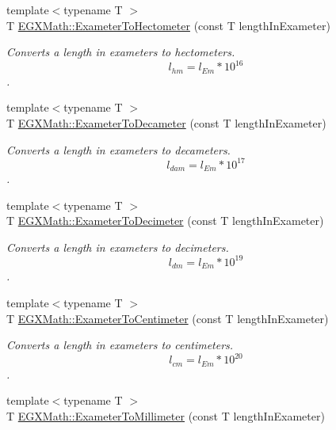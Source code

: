 \begin{DoxyCompactItemize}
{\footnotesize template$<$typename T $>$ }\\T \mbox{\hyperlink{group___e_g_x_math-_conversions-_length_conversions-_exameter-_s_i_gaa8f58d36da35b834499715694c75ce99}{E\+G\+X\+Math\+::\+Exameter\+To\+Hectometer}} (const T length\+In\+Exameter)
\begin{DoxyCompactList}\small\item\em Converts a length in exameters to hectometers. \[ l_{hm}=l_{Em} * 10^{16} \]. \end{DoxyCompactList}\item 
{\footnotesize template$<$typename T $>$ }\\T \mbox{\hyperlink{group___e_g_x_math-_conversions-_length_conversions-_exameter-_s_i_ga06159c597dfa489a8981c261622bf574}{E\+G\+X\+Math\+::\+Exameter\+To\+Decameter}} (const T length\+In\+Exameter)
\begin{DoxyCompactList}\small\item\em Converts a length in exameters to decameters. \[ l_{dam}=l_{Em} * 10^{17} \]. \end{DoxyCompactList}\item 
{\footnotesize template$<$typename T $>$ }\\T \mbox{\hyperlink{group___e_g_x_math-_conversions-_length_conversions-_exameter-_s_i_ga6d2909e8189cfc7b07d846a34f277afb}{E\+G\+X\+Math\+::\+Exameter\+To\+Decimeter}} (const T length\+In\+Exameter)
\begin{DoxyCompactList}\small\item\em Converts a length in exameters to decimeters. \[ l_{dm}=l_{Em} * 10^{19} \]. \end{DoxyCompactList}\item 
{\footnotesize template$<$typename T $>$ }\\T \mbox{\hyperlink{group___e_g_x_math-_conversions-_length_conversions-_exameter-_s_i_ga6f379e6cd3c3523fb3ff16eadcbefba9}{E\+G\+X\+Math\+::\+Exameter\+To\+Centimeter}} (const T length\+In\+Exameter)
\begin{DoxyCompactList}\small\item\em Converts a length in exameters to centimeters. \[ l_{cm}=l_{Em} * 10^{20} \]. \end{DoxyCompactList}\item 
{\footnotesize template$<$typename T $>$ }\\T \mbox{\hyperlink{group___e_g_x_math-_conversions-_length_conversions-_exameter-_s_i_ga71baa21a517793479c9bbb9e1a5c713b}{E\+G\+X\+Math\+::\+Exameter\+To\+Millimeter}} (const T length\+In\+Exameter)

\end{DoxyCompactItemize}
